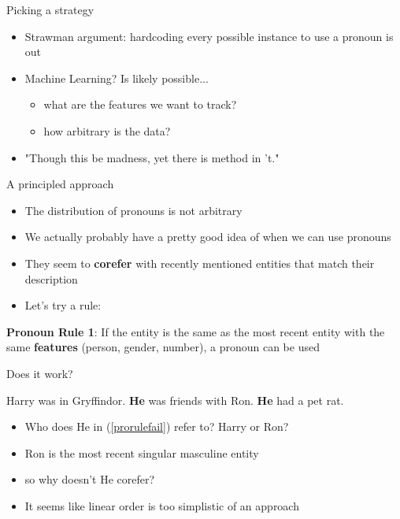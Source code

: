 \documentclass[10pt, compress]{beamer}		%
\begin{document}
\begin{frame}{Picking a strategy}
	\begin{itemize}
		\item Strawman argument: hardcoding every possible instance to use a pronoun is out 	\pause
		\item Machine Learning? \pause Is likely possible...	\pause
		\begin{itemize}
			\item what are the features we want to track?
			\item how arbitrary is the data?
		\end{itemize}
		\pause
		\item "Though this be madness, yet there is method in 't."
	\end{itemize}
\end{frame}

\begin{frame}{A principled approach}
	\begin{itemize}
		\item The distribution of pronouns is not arbitrary
		\item We actually probably have a pretty good idea of when we can use pronouns \pause
		\item They seem to \textbf{corefer} with recently mentioned entities that match their description \pause
		\item Let's try a rule:
	\end{itemize}

	\begin{exe}
		\ex \textbf{Pronoun Rule 1}: If the entity is the same as the most recent entity with the same \textbf{features} (person, gender, number), a pronoun can be used
	\end{exe}
\end{frame}

\begin{frame}{Does it work?}
	\begin{exe}
		\ex \begin{xlist}
			\ex Harry was in Gryffindor.
			\ex \textbf{He} was friends with Ron.
			\ex\label{prorulefail} \textbf{He} had a pet rat.
		\end{xlist}
	\end{exe}

	\begin{itemize}
		\item Who does \alert{He} in (\ref{prorulefail}) refer to? Harry or Ron? \pause
		\item Ron is the most recent singular masculine entity
		\item so why doesn't \alert{He} corefer? \pause
		\item It seems like linear order is too simplistic of an approach
	\end{itemize}
\end{frame}
\end{document}
